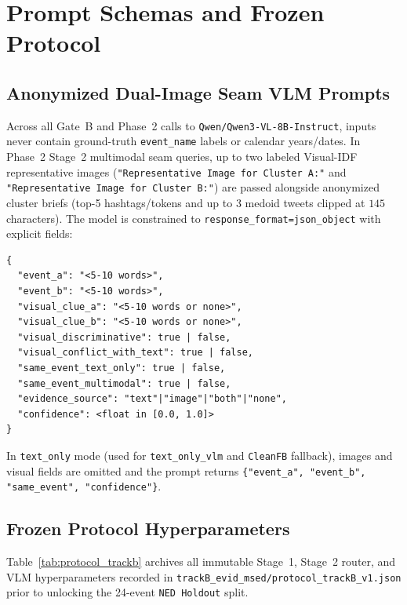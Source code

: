 \section{Prompt Schemas and Frozen Protocol}
\label{sec:appendix}

\subsection{Anonymized Dual-Image Seam VLM Prompts}
Across all Gate~B and Phase~2 calls to \texttt{Qwen/Qwen3-VL-8B-Instruct}, inputs never contain ground-truth \texttt{event\_name} labels or calendar years/dates. In Phase~2 Stage~2 multimodal seam queries, up to two labeled Visual-IDF representative images (\texttt{"Representative Image for Cluster A:"} and \texttt{"Representative Image for Cluster B:"}) are passed alongside anonymized cluster briefs (top-5 hashtags/tokens and up to 3 medoid tweets clipped at $145$ characters). The model is constrained to \texttt{response\_format=json\_object} with explicit fields:
\begin{verbatim}
{
  "event_a": "<5-10 words>",
  "event_b": "<5-10 words>",
  "visual_clue_a": "<5-10 words or none>",
  "visual_clue_b": "<5-10 words or none>",
  "visual_discriminative": true | false,
  "visual_conflict_with_text": true | false,
  "same_event_text_only": true | false,
  "same_event_multimodal": true | false,
  "evidence_source": "text"|"image"|"both"|"none",
  "confidence": <float in [0.0, 1.0]>
}
\end{verbatim}
In \texttt{text\_only} mode (used for \texttt{text\_only\_vlm} and \texttt{CleanFB} fallback), images and visual fields are omitted and the prompt returns \texttt{\{"event\_a", "event\_b", "same\_event", "confidence"\}}.

\subsection{Frozen Protocol Hyperparameters}
Table~\ref{tab:protocol_trackb} archives all immutable Stage~1, Stage~2 router, and VLM hyperparameters recorded in \texttt{trackB\_evid\_msed/protocol\_trackB\_v1.json} prior to unlocking the 24-event \texttt{NED Holdout} split.

